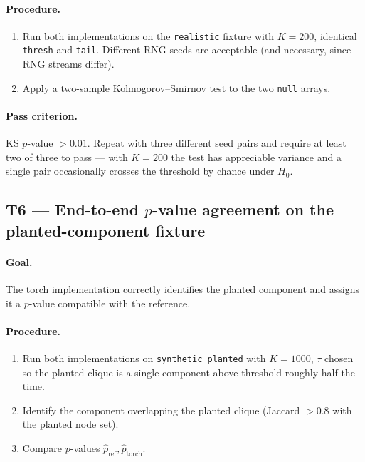 \documentclass[11pt]{article}
\begin{document}
\paragraph{Procedure.}
\begin{enumerate}[leftmargin=2.0em]
\item Run both implementations on the \texttt{realistic} fixture with $K = 200$, identical \texttt{thresh} and \texttt{tail}. Different RNG seeds are acceptable (and necessary, since RNG streams differ).
\item Apply a two-sample Kolmogorov--Smirnov test to the two \texttt{null} arrays.
\end{enumerate}

\paragraph{Pass criterion.} KS $p$-value $> 0.01$. Repeat with three different seed pairs and require at least two of three to pass --- with $K=200$ the test has appreciable variance and a single pair occasionally crosses the threshold by chance under $H_0$.

\subsection{T6 --- End-to-end $p$-value agreement on the planted-component fixture}

\paragraph{Goal.} The torch implementation correctly identifies the planted component and assigns it a $p$-value compatible with the reference.

\paragraph{Procedure.}
\begin{enumerate}[leftmargin=2.0em]
\item Run both implementations on \texttt{synthetic\_planted} with $K=1000$, $\tau$ chosen so the planted clique is a single component above threshold roughly half the time.
\item Identify the component overlapping the planted clique (Jaccard $> 0.8$ with the planted node set).
\item Compare $p$-values $\hat p_{\textrm{ref}}, \hat p_{\textrm{torch}}$.
\end{enumerate}
\end{document}
